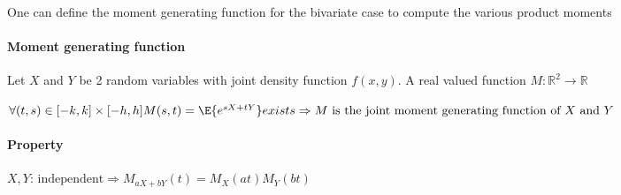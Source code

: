 One can define the moment generating function for the bivariate case to
compute the various product moments
\paragraph{Moment generating function}
Let $X$ and $Y$ be 2 random variables with joint density
function $f(x,y)$. A real valued function $M: \mathbb{R}^{2}\rightarrow\mathbb{R}$
\begin{center}
	$\forall (t,s)\in[-k,k]\times[-h,h]M(s,t)=\E{e^{sX+tY}} exists\Rightarrow M\text{ is the joint moment generating function of }X\text{ and }Y$
\end{center}
\paragraph{Property}
\begin{center}
	$X,Y\text{: independent}\Rightarrow M_{aX+bY}(t)=M_{X}(at)M_{Y}(bt)$
\end{center}

